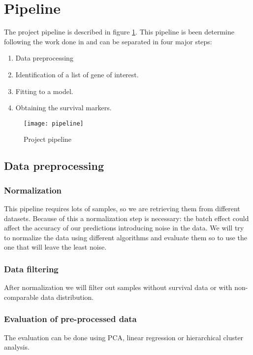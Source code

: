 \documentclass[fleqn,10pt]{SelfArx} %
\begin{document}
\section{Pipeline}
The project pipeline is described in figure \ref{fig:pipeline}.
This pipeline is been determine following the work done in \cite{Nartinez-Romero2018-gp} and can be separated in four major steps:

\begin{enumerate}
	\item Data preprocessing
	\item Identification of a list of gene of interest.
	\item Fitting to a model.
	\item Obtaining the survival markers.
\end{enumerate}

\begin{figure}[ht]\centering %
	\texttt{[image: pipeline]}
	\caption{Project pipeline}
	\label{fig:pipeline}
\end{figure}

	\subsection{Data preprocessing}

		\subsubsection{Normalization}
		This pipeline requires lots of samples, so we are retrieving them from different datasets.
		Because of this a normalization step is necessary: the batch effect could affect the accuracy of our predictions introducing noise in the data.
		We will try to normalize the data using different algorithms and evaluate them so to use the one that will leave the least noise.

		\subsubsection{Data filtering}
		After normalization we will filter out samples without survival data or with non-comparable data distribution.

		\subsubsection{Evaluation of pre-processed data}
		The evaluation can be done using PCA, linear regression or hierarchical cluster analysis.
\end{document}
